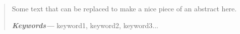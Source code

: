 \null\vspace{\fill}
\begin{abstract}

\setlength{\parindent}{0em}     %
\setlength{\parskip}{0.5em}     %

Some text that can be replaced to make a nice piece of an abstract here.

\vskip 5mm
\providecommand{\keywords}[1]
{\small	\textbf{\textit{Keywords---}} #1}
\keywords{keyword1, keyword2, keyword3...} %

\end{abstract}
\vspace{\fill}




